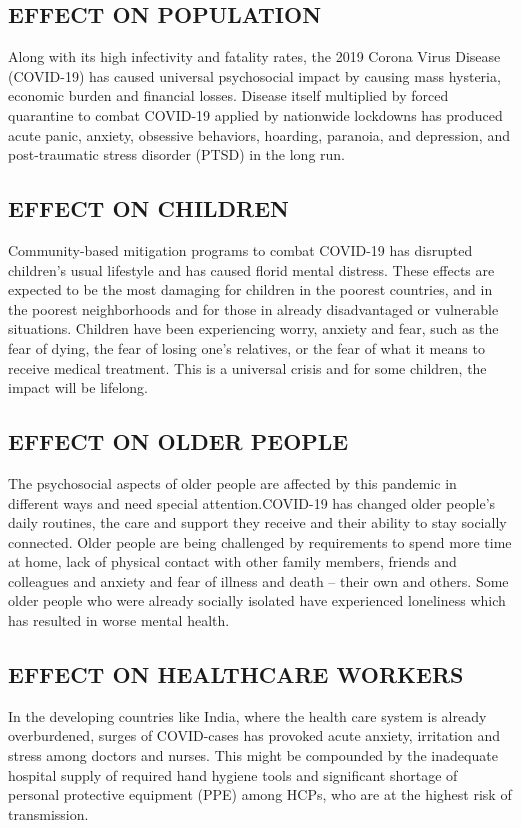 \documentclass{article}
\begin{document}
\subsection{EFFECT ON POPULATION}
Along with its high infectivity and fatality rates, the 2019 Corona Virus Disease (COVID-19) has caused universal psychosocial impact by causing mass hysteria, economic burden and financial losses.  Disease itself multiplied by forced quarantine to combat COVID-19 applied by nationwide lockdowns has produced acute panic, anxiety, obsessive behaviors, hoarding, paranoia, and depression, and post-traumatic stress disorder (PTSD) in the long run.
\subsection{EFFECT ON CHILDREN }
Community-based mitigation programs to combat COVID-19 has disrupted children’s usual lifestyle and has caused florid mental distress. These effects are expected to be the most damaging for children in the poorest countries, and in the poorest neighborhoods and for those in already disadvantaged or vulnerable situations. Children have been experiencing worry, anxiety and fear,  such as the fear of dying, the fear of losing one's relatives, or the fear of what it means to receive medical treatment. This is a universal crisis and for some children, the impact will be lifelong.
\subsection{EFFECT ON OLDER PEOPLE}
The psychosocial aspects of older people are affected by this pandemic in different ways and need special attention.COVID-19 has changed older people’s daily routines, the care and support they receive and their ability to stay socially connected. Older people are being challenged by requirements to spend more time at home, lack of physical contact with other family members, friends and colleagues  and anxiety and fear of illness and death – their own and others. Some older people who were already socially isolated have experienced loneliness which has resulted in worse mental health.
\subsection{EFFECT ON HEALTHCARE WORKERS}
In the developing countries like India, where the health care system is already overburdened, surges of COVID-cases has provoked acute anxiety, irritation and stress among doctors and nurses. This might be compounded by the inadequate hospital supply of required hand hygiene tools and significant shortage of personal protective equipment (PPE) among HCPs, who are at the highest risk of transmission.
\end{document}
